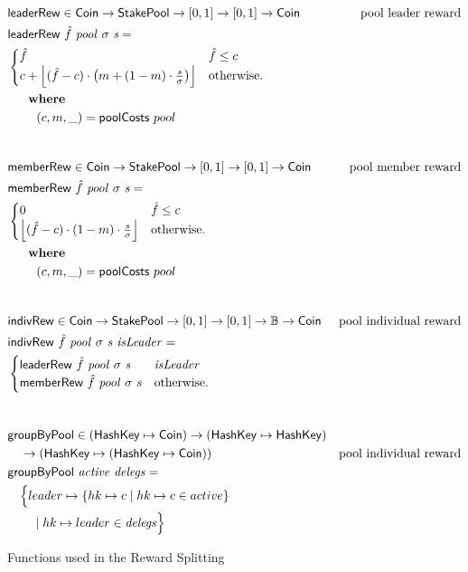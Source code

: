 \begin{figure}[htb]
  \begin{align*}
      & \fun{leaderRew} \in \Coin \to \StakePool \to [0, 1] \to [0, 1] \to \Coin
      & \text{pool leader reward} \\
      & \fun{leaderRew}~\hat{f}~\var{pool}~\sigma~\var{s} = \\
      & \begin{cases}
          \hat{f} & \hat{f} \leq c\\
          c + \floor*{(\hat{f} - c)\cdot\left(m + (1-m)\cdot\frac{s}{\sigma}\right) }&
          \text{otherwise.}
        \end{cases} \\
      & ~~~\where \\
      & ~~~~~~~(c, m, \_) = \fun{poolCosts}~pool \\
      \nextdef
      & \fun{memberRew} \in \Coin \to \StakePool \to [0, 1] \to [0, 1] \to \Coin
      & \text{pool member reward} \\
      & \fun{memberRew}~\hat{f}~\var{pool}~\sigma~\var{s} = \\
      & \begin{cases}
          0 & \hat{f} \leq c\\
          \floor*{(\hat{f} - c)\cdot(1-m)\cdot\frac{s}{\sigma}} &
          \text{otherwise.}
        \end{cases} \\
      & ~~~\where \\
      & ~~~~~~~(c, m, \_) = \fun{poolCosts}~pool \\
      \nextdef
      & \fun{indivRew} \in \Coin \to \StakePool \to [0, 1] \to [0, 1] \to \mathbb{B} \to \Coin
      & \text{pool individual reward} \\
      & \fun{indivRew}~\hat{f}~\var{pool}~\sigma~\var{s}~\var{isLeader} = \\
      & \begin{cases}
          \fun{leaderRew}~\hat{f}~\var{pool}~\sigma~\var{s} & \var{isLeader} \\
        \fun{memberRew}~\hat{f}~\var{pool}~\sigma~\var{s} & \text{otherwise.}
        \end{cases} \\
      \nextdef
      & \fun{groupByPool} \in (\HashKey \mapsto \Coin) \to (\HashKey \mapsto \HashKey) \\
      & ~~~\to
        \left(
        \HashKey \mapsto
        \left(
        \HashKey \mapsto \Coin
        \right)
        \right)
      & \text{pool individual reward} \\
      & \fun{groupByPool}~\var{active}~\var{delegs} = \\
      & ~~~\Big\{ leader \mapsto
      \{hk \mapsto c \mid hk \mapsto c \in active\} \\
      & ~~~~~~            \mid hk \mapsto leader\in\var{delegs} \Big\}
  \end{align*}
  \caption{Functions used in the Reward Splitting}
  \label{fig:functions:reward-splitting}
\end{figure}


